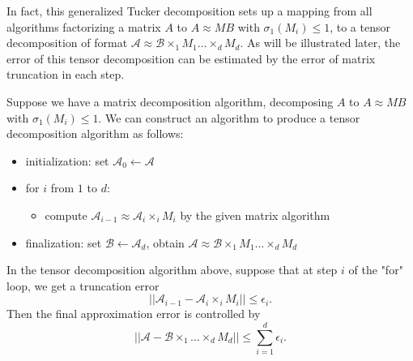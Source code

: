 \documentclass[12pt]{article}
\begin{document}
In fact, this generalized Tucker decomposition sets up a mapping from all algorithms factorizing a matrix $A$ to $A \approx M B$ with $\sigma_1(M_i) \leq 1$, to a tensor decomposition of format $ \mathcal{A} \approx \mathcal{B} \times_1 M_1 \dots \times_d M_d $. As will be illustrated later, the error of this tensor decomposition can be estimated by the error of matrix truncation in each step.

\begin{myalgo}
Suppose we have a matrix decomposition algorithm, decomposing $A$ to $A \approx M B$ with $\sigma_1(M_i) \leq 1$. We can construct an algorithm to produce a tensor decomposition algorithm as follows:
\begin{itemize}
\item initialization: set $\mathcal{A}_0 \leftarrow \mathcal{A}$
\item for $i$ from $1$ to $d$: 
	\begin{itemize}
		\item compute $\mathcal{A}_{i-1} \approx \mathcal{A}_i \times_i M_i $ by the given matrix algorithm
	\end{itemize}
\item finalization: set $\mathcal{B} \leftarrow \mathcal{A}_d$, obtain $\mathcal{A} \approx  \mathcal{B} \times_1 M_1 \dots \times_d M_d $
\end{itemize}
\end{myalgo}

\begin{mythm}
In the tensor decomposition algorithm above, suppose that at step $i$ of the "for" loop, we get a truncation error
$$ || \mathcal{A}_{i-1} - \mathcal{A}_i \times_i M_i || \leq \epsilon_i. $$
Then the final approximation error is controlled by 
$$ || \mathcal{A} - \mathcal{B} \times_1 \dots \times_d M_d || \leq \sum_{i = 1}^d \epsilon_i. $$
\end{mythm}
\end{document}
